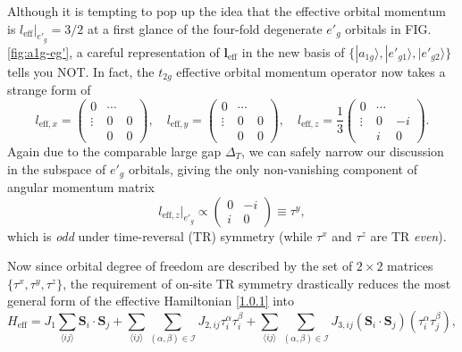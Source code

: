 \documentclass[10pt,nofootinbib,letterpaper]{revtex4}
\begin{document}
		Although it is tempting to pop up the idea that the effective orbital momentum is $l_{\text{eff}}|_{e'_g}=3/2$ at a first glance of the four-fold degenerate $e'_g$ orbitals in FIG. \ref{fig:a1g-eg'}, a careful representation of $\bm{l}_{\text{eff}}$ in the new basis of $\{|a_{1g}\rangle,|e'_{g1}\rangle,|e'_{g2}\rangle\}$ tells you NOT. In fact, the $t_{2g}$ effective orbital momentum operator now takes a strange form of
		\begin{equation}\label{1.3.1}
			l_{\text{eff},x}=\left(\begin{array}{c|cc}
				0 & \cdots &\\
				\hline
				\vdots & 0 & 0\\
				 & 0& 0
			\end{array}\right),\quad
			l_{\text{eff},y}=\left(\begin{array}{c|cc}
				0 & \cdots &\\
				\hline
				\vdots & 0 & 0\\
				 & 0& 0
			\end{array}\right),\quad
			l_{\text{eff},z}=\dfrac{1}{3}\left(\begin{array}{c|cc}
				0 & \cdots &\\
				\hline
				\vdots & 0 & -i\\
				 & i & 0
			\end{array}\right).
		\end{equation}
		Again due to the comparable large gap $\Delta_T$, we can safely narrow our discussion in the subspace of $e'_g$ orbitals, giving the only non-vanishing component of angular momentum matrix
		\begin{equation}\label{1.3.2}
			l_{\text{eff},z}|_{e'_g}\propto\left(\begin{array}{cc}
				0 &-i\\i & 0
			\end{array}\right)\equiv\tau^y,
		\end{equation}
		which is \emph{odd} under time-reversal (TR) symmetry (while $\tau^x$ and $\tau^z$ are TR \emph{even}).\par
		Now since orbital degree of freedom are described by the set of $2\times2$ matrices $\{\tau^x,\tau^y,\tau^z\}$, the requirement of on-site TR symmetry drastically reduces the most general form of the effective Hamiltonian \eqref{1.0.1} into
		\begin{equation}\label{1.3.3}
			H_{\text{eff}}=J_1\sum_{\langle ij \rangle}\bm{S}_i\cdot\bm{S}_j+\sum_{\langle ij \rangle}\sum_{(\alpha,\beta)\in\mathcal{I}}J_{2,ij}\tau_i^\alpha\tau_i^\beta+\sum_{\langle ij \rangle }\sum_{(\alpha,\beta)\in\mathcal{I}}J_{3,ij}(\bm{S}_i\cdot\bm{S}_j)(\tau_i^\alpha\tau_j^\beta),
		\end{equation}
\end{document}
